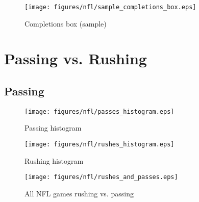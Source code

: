 \documentclass{exam}
\begin{document}
  \begin{figure}[H]
    \centering
    \texttt{[image: figures/nfl/sample\_completions\_box.eps]}
    \caption{Completions box (sample)}
  \end{figure}

  \section{Passing vs. Rushing}

  \subsection{Passing}
  \begin{figure}[H]
    \centering
    \texttt{[image: figures/nfl/passes\_histogram.eps]}
    \caption{Passing histogram}
  \end{figure}

  \begin{figure}[H]
    \centering
    \texttt{[image: figures/nfl/rushes\_histogram.eps]}
    \caption{Rushing histogram}
  \end{figure}

  \begin{figure}[H]
    \centering
    \texttt{[image: figures/nfl/rushes\_and\_passes.eps]}
    \caption{All NFL games rushing vs. passing}
  \end{figure}


\end{document}
